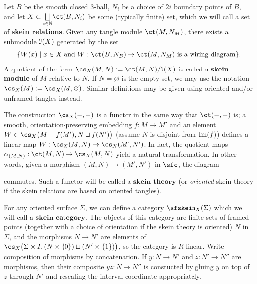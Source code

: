 \begin{definition}
Let $B$ be the smooth closed $3$-ball, $N_i$ be a choice of $2i$ boundary points of $B$, and let $X \subset \underset{i \in \N}{\bigsqcup} \ct(B, N_i)$ be some (typically finite) set, which we will call a set of \textbf{skein relations}. Given any tangle module $\ct(M, N_M)$, there exists a submodule $\mathcal{I}(X)$ generated by the set 
\[\{ W(x) \mid x \in X \text{ and } W:\ct(B, N_B) \to \ct(M, N_M) \text{ is a wiring diagram} \}.\] 
A quotient of the form $\cs_X(M, N) := \ct(M, N) / \ci(X)$ is called a \textbf{skein module} of $M$ relative to $N$. If $N = \varnothing$ is the empty set, we may use the notation $\cs_X(M) := \cs_X(M, \varnothing)$. Similar definitions may be given using oriented and/or unframed tangles instead. 
\end{definition}
The construction $\cs_X(-, -)$ is a functor in the same way that $\ct(-, -)$ is; a smooth, orientation-preserving embedding $f: M \to M'$ and an element $W \in \cs_X\big( M-f(M'), N \sqcup f(N') \big)$ (assume $N$ is disjoint from ${\rm{Im}}(f)$) defines a linear map $W: \cs_X(M, N) \to \cs_X(M', N')$. In fact, the quotient maps $\alpha_{(M, N)}: \ct(M, N) \to \cs_X(M, N)$ yield a natural transformation. In other words, given a morphism $(M, N) \to (M', N')$ in $\sfc$, the diagram
\begin{center}
\end{center}
commutes. Such a functor will be called a $\textbf{skein theory}$ (or \textit{oriented} skein theory if the skein relations are based on oriented tangles). 

For any oriented surface $\Sigma$, we can define a category $\sfskein_X(\Sigma)$ which we will call a $\textbf{skein category}$. The objects of this category are finite sets of framed points (together with a choice of orientation if the skein theory is oriented) $N$ in $\Sigma$, and the morphisms $N \to N'$ are elements of $\cs_X\big(\Sigma \times I, (N \times \{0\}) \sqcup (N' \times \{1\})\big)$, so the category is $R$-linear. Write composition of morphisms by concatenation. If $y:N \to N'$ and $z:N' \to N''$ are morphisms, then their composite $yz:N \to N''$ is constucted by gluing $y$ on top of $z$ through $N'$ and rescaling the interval coordinate appropriately.

